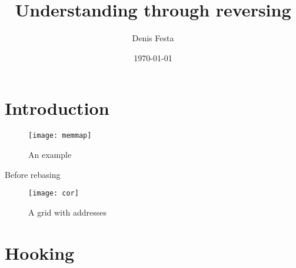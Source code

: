 \documentclass[10pt, twocolumn, a4paper]{article}
\begin{document}
\title{Understanding through reversing}
\author{Denis Festa}
\date{\today}

\maketitle

\tableofcontents

\section{Introduction}
%
%
\begin{figure}[ht]
	\centering
	\texttt{[image: memmap]}
	\caption{An example}
	\label{fig:exmemmap}
\end{figure}

Before rebasing

\begin{figure*}[ht]
	\centering
	\texttt{[image: cor]}
	\caption{A grid with addresses}
	\label{fig:cor}
\end{figure*}



\section{Hooking}


\end{document}
